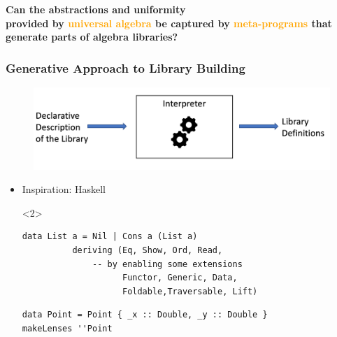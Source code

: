 \documentclass[t,10pt,numbers,fleqn,usenames,xcolor=dvipsnames]{beamer}
\begin{document}
\begin{frame}%
\vfill 
\begin{center}
\Large{\textbf{
Can the abstractions and uniformity \\
provided by \textcolor{Orange}{universal algebra} be captured by 
\textcolor{Orange}{meta-programs} 
that generate parts of algebra libraries? }}
\end{center}
\vfill 
\end{frame}


\begin{frame}[fragile]
\frametitle{Generative Approach to Library Building}
\begin{figure}
    \includegraphics[scale=0.2]{figures/interpreter_small.png}
\end{figure}
\pause
\begin{itemize}
    \item Inspiration: Haskell  
\begin{onlyenv}<2>
    \begin{verbatim}
data List a = Nil | Cons a (List a) 
          deriving (Eq, Show, Ord, Read,
              -- by enabling some extensions 
                    Functor, Generic, Data,         
                    Foldable,Traversable, Lift)
    \end{verbatim}
    \vspace{0.5cm}
    \begin{verbatim}
data Point = Point { _x :: Double, _y :: Double }
makeLenses ''Point  
     \end{verbatim}
\end{onlyenv}     
\end{itemize}
\end{frame}
\end{document}
